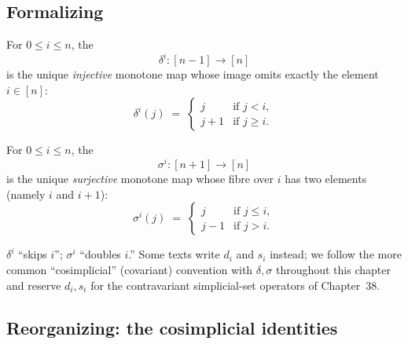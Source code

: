 \subsection{Formalizing}

\begin{definition}
\label{def:face-map}
For $0 \leq i \leq n$, the 
\begin{equation*}
  \delta^i : [n-1] \longrightarrow [n]
\end{equation*}
is the unique \emph{injective} monotone map whose image omits exactly the
element $i \in [n]$:
\begin{equation*}
  \delta^i(j) \;=\; \begin{cases} j & \text{if } j < i, \\ j + 1 & \text{if }
  j \geq i. \end{cases}
\end{equation*}
\end{definition}

\begin{definition}
\label{def:degeneracy-map}
For $0 \leq i \leq n$, the 
\begin{equation*}
  \sigma^i : [n+1] \longrightarrow [n]
\end{equation*}
is the unique \emph{surjective} monotone map whose fibre over $i$ has two
elements (namely $i$ and $i+1$):
\begin{equation*}
  \sigma^i(j) \;=\; \begin{cases} j & \text{if } j \leq i, \\ j - 1 & \text{if }
  j > i. \end{cases}
\end{equation*}
\end{definition}

\begin{howtosay}
$\delta^i$  ``skips $i$''; $\sigma^i$
 ``doubles $i$.'' Some texts write $d_i$
and $s_i$ instead; we follow the more common ``cosimplicial'' (covariant)
convention with $\delta, \sigma$ throughout this chapter and reserve
$d_i, s_i$ for the contravariant simplicial-set operators of Chapter~38.
\end{howtosay}

\subsection{Reorganizing: the cosimplicial identities}

